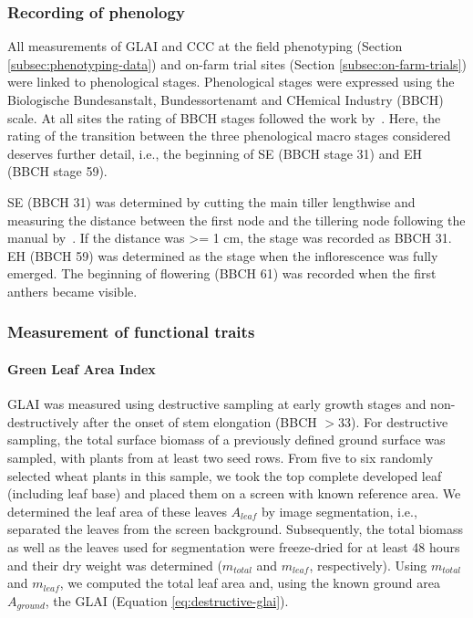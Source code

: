 \subsubsection{Recording of phenology}
\label{subsubsec:phenology-recoding}
All measurements of GLAI and CCC at the field phenotyping (Section \ref{subsec:phenotyping-data}) and on-farm trial sites (Section \ref{subsec:on-farm-trials}) were linked to phenological stages. Phenological stages were expressed using the Biologische Bundesanstalt, Bundessortenamt and CHemical Industry (BBCH) scale. At all sites the rating of BBCH stages followed the work by~\citet{lancashire_uniform_1991}. Here, the rating of the transition between the three phenological macro stages considered deserves further detail, i.e., the beginning of SE (BBCH stage 31) and EH (BBCH stage 59).

SE (BBCH 31) was determined by cutting the main tiller lengthwise and measuring the distance between the first node and the tillering node following the manual by~\cite{pask_physiological_2012}. If the distance was >= 1 cm, the stage was recorded as BBCH 31. EH (BBCH 59) was determined as the stage when the inflorescence was fully emerged. The beginning of flowering (BBCH 61) was recorded when the first anthers became visible.

\subsubsection{Measurement of functional traits}
\label{subsubsec:trait-measurement}

\paragraph{Green Leaf Area Index}
GLAI was measured using destructive sampling at early growth stages and non-destructively after the onset of stem elongation (BBCH $>$33). For destructive sampling, the total surface biomass of a previously defined ground surface was sampled, with plants from at least two seed rows. From five to six randomly selected wheat plants in this sample, we took the top complete developed leaf (including leaf base) and placed them on a screen with known reference area. We determined the leaf area of these leaves $A_{leaf}$ by image segmentation, i.e., separated the leaves from the screen background. Subsequently, the total biomass as well as the leaves used for segmentation were freeze-dried for at least 48 hours and their dry weight was determined ($m_{total}$ and $m_{leaf}$, respectively). Using $m_{total}$ and $m_{leaf}$, we computed the total leaf area and, using the known ground area $A_{ground}$, the GLAI (Equation \ref{eq:destructive-glai}).

